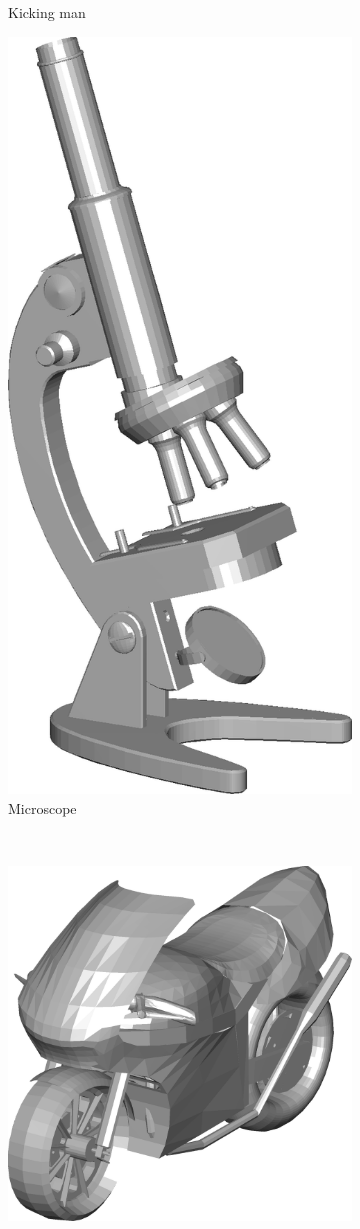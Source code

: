 \begin{figure}
\begin{subfigure}[t]{0.19\linewidth}
		\caption{Kicking man} 	
	\end{subfigure} 
	\begin{subfigure}[t]{0.19\linewidth} \centering
		\includegraphics[width=0.5\linewidth]{./fig/eval/15microscope.png}  
		\caption{Microscope} 	
	\end{subfigure} \\ 
	\begin{subfigure}[t]{0.19\linewidth} \centering
		\includegraphics[width=1\linewidth]{./fig/eval/16motorbike.png}  

\end{subfigure}
\end{figure}

